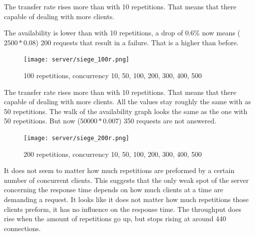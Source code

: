 The transfer rate rises more than with 10 repetitions. That means that there capable of dealing with more clients.

The availability is lower than with 10 repetitions, a drop of 0.6\% now means ($2500 * 0.08$) 200 requests that result in a failure. That is a higher than before.
\begin{figure}[H]
\center
\texttt{[image: server/siege\_100r.png]}
\caption{100 repetitions, concurrency 10, 50, 100, 200, 300, 400, 500}
\end{figure}
The transfer rate rises more than with 10 repetitions. That means that there capable of dealing with more clients.
All the values stay roughly the same with as 50 repetitions. The walk of the availability graph looks the same as the one with 50 repetitions. But now ($50000 * 0.007$) 350 requests are not answered.

\begin{figure}[H]
\center
\texttt{[image: server/siege\_200r.png]}
\caption{200 repetitions, concurrency 10, 50, 100, 200, 300, 400, 500}
\end{figure}

It does not seem to matter how much repetitions are preformed by a certain number of concurrent clients. This suggests that the only weak spot of the server concerning the response time depends on how much clients at a time are demanding a request. It looks like it does not matter how much repetitions those clients preform, it has no influence on the response time. The throughput does rise when the amount of repetitions go up, but stops rising at around 440 connections. 


